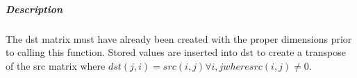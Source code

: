 \subparagraph{Description}

The dst matrix must have already been created with the proper dimensions
prior to calling this function.  Stored values are inserted into dst to
create a transpose of the src matrix where 
$dst(j,i) = src(i,j) \forall i,j where src(i,j) \neq 0$.




